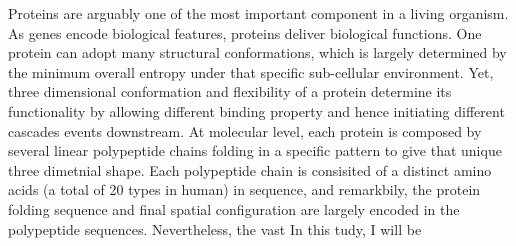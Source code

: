 Proteins are arguably one of the most important component in a living organism. As genes encode biological features, proteins deliver biological functions. One protein can adopt many structural conformations, which is largely determined by the minimum overall entropy under that specific sub-cellular environment. Yet, three dimensional conformation and flexibility of a protein determine its functionality by allowing different binding property and hence initiating different cascades events downstream. At molecular level, each protein is composed by several linear polypeptide chains folding in a specific pattern to give that unique three dimetnial shape. Each polypeptide chain is consisited of a distinct amino acids (a total of 20 types in human) in sequence, and remarkbily, the protein folding sequence and final spatial configuration are largely encoded in the polypeptide sequences. Nevertheless, the vast  In this tudy, I will be 